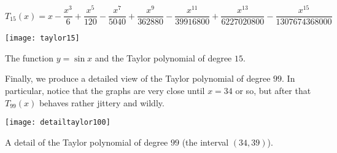 \documentclass[12pt]{article}
\begin{document}
$$T_{15}(x)=x-\frac{x^3}{6} + \frac{x^5}{120} - \frac{x^7}{5040} + \frac{x^9}{362880} - \frac{x^{11}}{39916800} + \frac{x^{13}}{6227020800} - \frac{x^{15}}{1307674368000}$$

\begin{center}
\texttt{[image: taylor15]}

The function $y=\sin x$ and the Taylor polynomial of degree $15$.
\end{center}

Finally, we produce a detailed view of the Taylor polynomial of degree $99$. In particular, notice that the graphs are very close until $x=34$ or so, but after that $T_{99}(x)$ behaves rather jittery and wildly.

\begin{center}
\texttt{[image: detailtaylor100]}

A detail of the Taylor polynomial of degree $99$ (the interval $(34,39)$).
\end{center}
\end{document}
